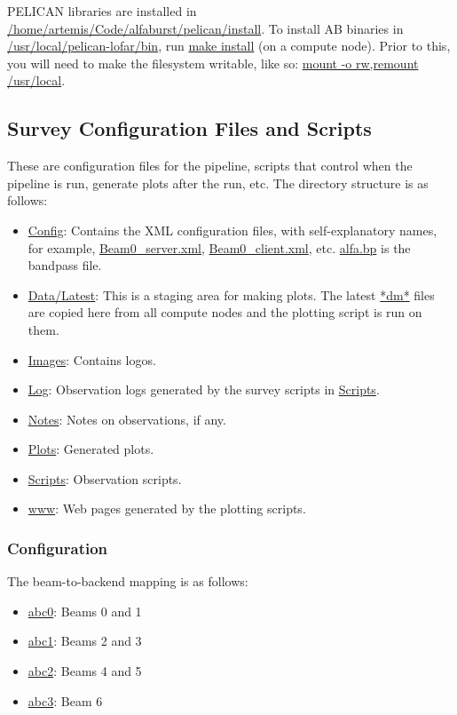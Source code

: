\documentclass{article}
\begin{document}
PELICAN libraries are installed in
\url{/home/artemis/Code/alfaburst/pelican/install}. To install AB binaries in
\url{/usr/local/pelican-lofar/bin}, run \url{make install} (on a
compute node). Prior to this, you will need to make the filesystem writable,
like so: \url{mount -o rw,remount /usr/local}.


\subsection{Survey Configuration Files and Scripts}

These are configuration files for the pipeline, scripts that control when the
pipeline is run, generate plots after the run, etc. The directory structure is
as follows:

\begin{itemize}
\item \url{Config}: Contains the XML configuration files, with self-explanatory
names, for example, \url{Beam0_server.xml}, \url{Beam0_client.xml}, etc.
\url{alfa.bp} is the bandpass file.
\item \url{Data/Latest}: This is a staging area for making plots. The latest
\url{*dm*} files are copied here from all compute nodes and the plotting script
is run on them.
\item \url{Images}: Contains logos.
\item \url{Log}: Observation logs generated by the survey scripts in
\url{Scripts}.
\item \url{Notes}: Notes on observations, if any.
\item \url{Plots}: Generated plots.
\item \url{Scripts}: Observation scripts.
\item \url{www}: Web pages generated by the plotting scripts.
\end{itemize}


\subsubsection{Configuration}

The beam-to-backend mapping is as follows:

\begin{itemize}
\item \url{abc0}: Beams 0 and 1
\item \url{abc1}: Beams 2 and 3
\item \url{abc2}: Beams 4 and 5
\item \url{abc3}: Beam 6
\end{itemize}
\end{document}
